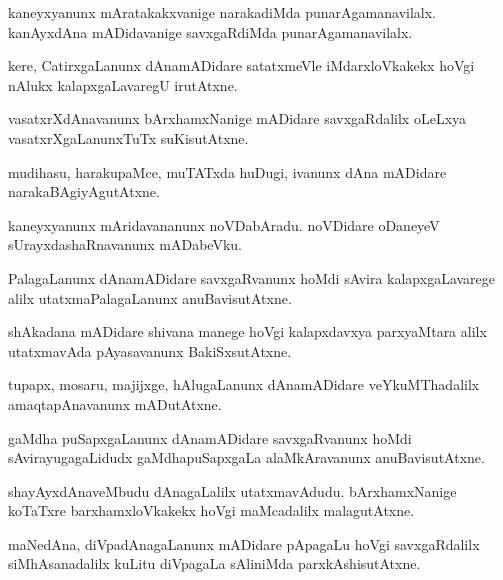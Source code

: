 \begin{mng}
kaneyxyanunx mAratakakxvanige narakadiMda punarAgamanavilalx. kanAyxdAna mADidavanige savxgaRdiMda punarAgamanavilalx.
\end{mng}

\begin{mng}
kere, CatirxgaLanunx dAnamADidare satatxmeVle iMdarxloVkakekx hoVgi nAlukx kalapxgaLavaregU irutAtxne.
\end{mng}

\begin{mng}
vasatxrXdAnavanunx bArxhamxNanige mADidare savxgaRdalilx oLeLxya vasatxrXgaLanunxTuTx suKisutAtxne.
\end{mng}

\begin{mng}
mudihasu, harakupaMce, muTATxda huDugi, ivanunx dAna mADidare narakaBAgiyAgutAtxne.
\end{mng}

\begin{mng}
kaneyxyanunx mAridavananunx noVDabAradu. noVDidare oDaneyeV sUrayxdashaRnavanunx mADabeVku.
\end{mng}

\begin{mng}
PalagaLanunx dAnamADidare savxgaRvanunx hoMdi sAvira kalapxgaLavarege alilx utatxmaPalagaLanunx anuBavisutAtxne.
\end{mng}

\begin{mng}
shAkadana mADidare shivana manege hoVgi kalapxdavxya parxyaMtara alilx utatxmavAda pAyasavanunx BakiSxsutAtxne.
\end{mng}

\begin{mng}
tupapx, mosaru, majijxge, hAlugaLanunx dAnamADidare veYkuMThadalilx amaqtapAnavanunx mADutAtxne.
\end{mng}

\begin{mng}
gaMdha puSapxgaLanunx dAnamADidare savxgaRvanunx hoMdi sAvirayugagaLidudx gaMdhapuSapxgaLa alaMkAravanunx anuBavisutAtxne.
\end{mng}

\begin{mng}
shayAyxdAnaveMbudu dAnagaLalilx utatxmavAdudu. bArxhamxNanige koTaTxre barxhamxloVkakekx hoVgi maMcadalilx malagutAtxne.
\end{mng}

\begin{mng}
maNedAna, diVpadAnagaLanunx mADidare pApagaLu hoVgi savxgaRdalilx siMhAsanadalilx kuLitu diVpagaLa sAliniMda parxkAshisutAtxne.
\end{mng}

